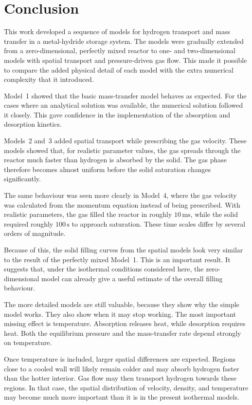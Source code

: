 \newpage
\section{Conclusion}\label{sec:conclusion}

This work developed a sequence of models for hydrogen transport and mass transfer in a metal-hydride storage system. The models were gradually extended from a zero-dimensional, perfectly mixed reactor to one- and two-dimensional models with spatial transport and pressure-driven gas flow. This made it possible to compare the added physical detail of each model with the extra numerical complexity that it introduced.

Model~1 showed that the basic mass-transfer model behaves as expected. For the cases where an analytical solution was available, the numerical solution followed it closely. This gave confidence in the implementation of the absorption and desorption kinetics.

Models~2 and~3 added spatial transport while prescribing the gas velocity. These models showed that, for realistic parameter values, the gas spreads through the reactor much faster than hydrogen is absorbed by the solid. The gas phase therefore becomes almost uniform before the solid saturation changes significantly.

The same behaviour was seen more clearly in Model~4, where the gas velocity was calculated from the momentum equation instead of being prescribed. With realistic parameters, the gas filled the reactor in roughly $10\,\mathrm{ms}$, while the solid required roughly $100\,\mathrm{s}$ to approach saturation. These time scales differ by several orders of magnitude.

Because of this, the solid filling curves from the spatial models look very similar to the result of the perfectly mixed Model~1. This is an important result. It suggests that, under the isothermal conditions considered here, the zero-dimensional model can already give a useful estimate of the overall filling behaviour.

The more detailed models are still valuable, because they show why the simple model works. They also show when it may stop working. The most important missing effect is temperature. Absorption releases heat, while desorption requires heat. Both the equilibrium pressure and the mass-transfer rate depend strongly on temperature.

Once temperature is included, larger spatial differences are expected. Regions close to a cooled wall will likely remain colder and may absorb hydrogen faster than the hotter interior. Gas flow may then transport hydrogen towards these regions. In that case, the spatial distribution of velocity, density, and temperature may become much more important than it is in the present isothermal models.

